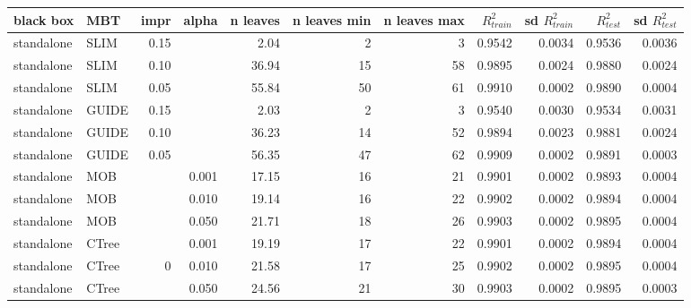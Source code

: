 \begin{table}[!htb]

\centering \tiny
\begin{tabular}[t]{l|l|r|r|r|r|r|r|r|r|r}
\hline
black box & MBT & impr & alpha & n leaves & n leaves min & n leaves max &  $R^2_{train}$ & sd $R^2_{train}$ & $R^2_{test}$ & sd $R^2_{test}$\\

\hline

standalone & SLIM & 0.15 & & 2.04 & 2 & 3 & 0.9542 & 0.0034 & 0.9536 & 0.0036\\
standalone & SLIM & 0.10 & & 36.94 & 15 & 58 & 0.9895 & 0.0024 & 0.9880 & 0.0024\\
standalone & SLIM & 0.05 & & 55.84 & 50 & 61 & 0.9910 & 0.0002 & 0.9890 & 0.0004\\
standalone & GUIDE & 0.15 & & 2.03 & 2 & 3 & 0.9540 & 0.0030 & 0.9534 & 0.0031\\
standalone & GUIDE & 0.10 & & 36.23 & 14 & 52 & 0.9894 & 0.0023 & 0.9881 & 0.0024\\
standalone & GUIDE & 0.05 & & 56.35 & 47 & 62 & 0.9909 & 0.0002 & 0.9891 & 0.0003\\
standalone & MOB & & 0.001 & 17.15 & 16 & 21 & 0.9901 & 0.0002 & 0.9893 & 0.0004\\
standalone & MOB & & 0.010 & 19.14 & 16 & 22 & 0.9902 & 0.0002 & 0.9894 & 0.0004\\
standalone & MOB & & 0.050 & 21.71 & 18 & 26 & 0.9903 & 0.0002 & 0.9895 & 0.0004\\
standalone & CTree & & 0.001 & 19.19 & 17 & 22 & 0.9901 & 0.0002 & 0.9894 & 0.0004\\
standalone & CTree &0 & 0.010 & 21.58 & 17 & 25 & 0.9902 & 0.0002 & 0.9895 & 0.0004\\
standalone & CTree & & 0.050 & 24.56 & 21 & 30 & 0.9903 & 0.0002 & 0.9895 & 0.0003\\



\end{tabular}
\end{table}
